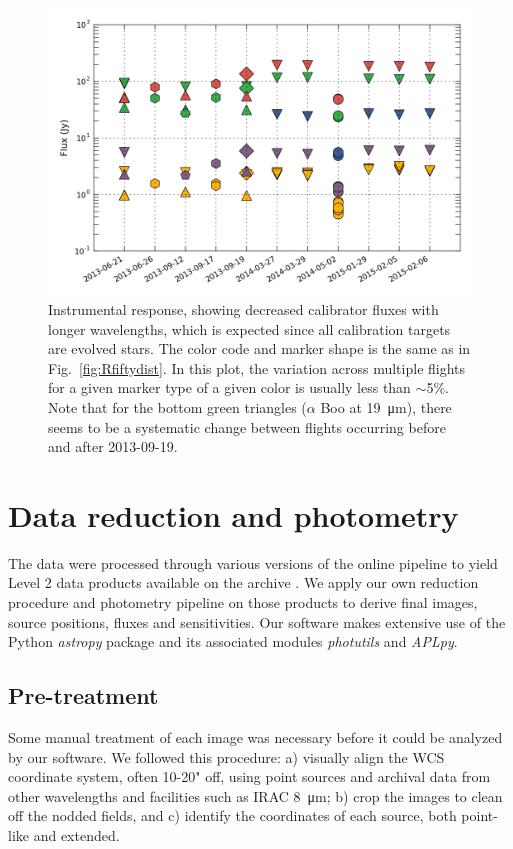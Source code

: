 \begin{figure}[!h]
\begin{center}
\includegraphics[width=\textwidth]{Figures/Phot_val.png}
\vspace{-0.5cm}
\caption[Instrumental response]{Instrumental response, showing decreased calibrator fluxes with longer wavelengths, which is expected since all calibration targets are evolved stars. The color code and marker shape is the same as in Fig.~\ref{fig:Rfiftydist}. In this plot, the variation across multiple flights for a given marker type of a given color is usually less than $\sim$5\%. Note that for the bottom green triangles ($\alpha$ Boo at \SI{19}{\um}), there seems to be a systematic change between flights occurring before and after 2013-09-19.}
\label{fig:response}
\end{center}
\end{figure}


\section{Data reduction and photometry}

The data were processed through various versions of the online pipeline to yield Level 2 data products available on the archive \citep{Herter:2013by}. We apply our own reduction procedure and photometry pipeline on those products to derive final images, source positions, fluxes and sensitivities. Our software makes extensive use of the Python \textit{astropy} package \citep{2013A&A...558A..33A} and its associated modules \textit{photutils} and \textit{APLpy}. 

\subsection{Pre-treatment}
Some manual treatment of each image was necessary before it could be analyzed by our software. We followed this procedure: a) visually align the WCS coordinate system, often 10-20" off, using point sources and archival data from other wavelengths and facilities such as IRAC \SI{8}{\micro\meter}; b) crop the images to clean off the nodded fields, and c) identify the coordinates of each source, both point-like and extended.

